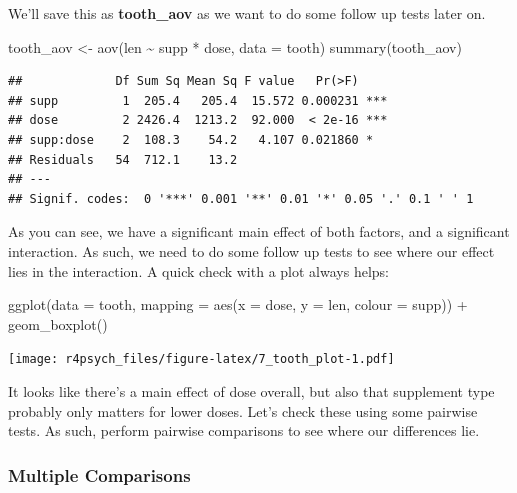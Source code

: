 \documentclass[
]{book}
\newenvironment{Shaded}{\begin{snugshade}}{\end{snugshade}}
\newcommand{\AttributeTok}[1]{\textcolor[rgb]{0.77,0.63,0.00}{#1}}
\newcommand{\FunctionTok}[1]{\textcolor[rgb]{0.00,0.00,0.00}{#1}}
\newcommand{\NormalTok}[1]{#1}
\newcommand{\OtherTok}[1]{\textcolor[rgb]{0.56,0.35,0.01}{#1}}
\newcommand{\SpecialCharTok}[1]{\textcolor[rgb]{0.00,0.00,0.00}{#1}}
\begin{document}
We'll save this as \textbf{tooth\_aov} as we want to do some follow up tests later on.

\begin{Shaded}
\begin{Highlighting}[]
\NormalTok{tooth\_aov }\OtherTok{\textless{}{-}} \FunctionTok{aov}\NormalTok{(len }\SpecialCharTok{\textasciitilde{}}\NormalTok{ supp }\SpecialCharTok{*}\NormalTok{ dose, }\AttributeTok{data =}\NormalTok{ tooth)}
\FunctionTok{summary}\NormalTok{(tooth\_aov)}
\end{Highlighting}
\end{Shaded}

\begin{verbatim}
##             Df Sum Sq Mean Sq F value   Pr(>F)    
## supp         1  205.4   205.4  15.572 0.000231 ***
## dose         2 2426.4  1213.2  92.000  < 2e-16 ***
## supp:dose    2  108.3    54.2   4.107 0.021860 *  
## Residuals   54  712.1    13.2                     
## ---
## Signif. codes:  0 '***' 0.001 '**' 0.01 '*' 0.05 '.' 0.1 ' ' 1
\end{verbatim}

As you can see, we have a significant main effect of both factors, and a significant interaction. As such, we need to do some follow up tests to see where our effect lies in the interaction. A quick check with a plot always helps:

\begin{Shaded}
\begin{Highlighting}[]
\FunctionTok{ggplot}\NormalTok{(}\AttributeTok{data =}\NormalTok{ tooth, }\AttributeTok{mapping =} \FunctionTok{aes}\NormalTok{(}\AttributeTok{x =}\NormalTok{ dose, }\AttributeTok{y =}\NormalTok{ len, }\AttributeTok{colour =}\NormalTok{ supp)) }\SpecialCharTok{+}
  \FunctionTok{geom\_boxplot}\NormalTok{()}
\end{Highlighting}
\end{Shaded}

\texttt{[image: r4psych\_files/figure-latex/7\_tooth\_plot-1.pdf]}

It looks like there's a main effect of dose overall, but also that supplement type probably only matters for lower doses. Let's check these using some pairwise tests. As such, perform pairwise comparisons to see where our differences lie.

\hypertarget{multiple-comparisons}{%
\subsubsection{Multiple Comparisons}\label{multiple-comparisons}}
\end{document}

